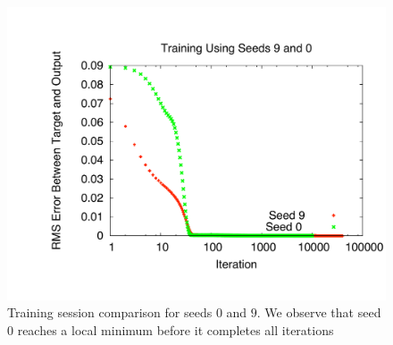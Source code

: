 \documentclass[11pt]{article}
\begin{document}
\begin{figure}[htbp]
	\centering
		\includegraphics[width=0.85\columnwidth]{../bpgt-3.0/damping_test/Trainings.pdf}
	\caption{Training session comparison for seeds $0$ and $9$. We observe that seed $0$ reaches a local minimum before it completes all iterations}
	\label{fig:bpgt-3.0_damping_test_Trainings}
\end{figure}
\end{document}

